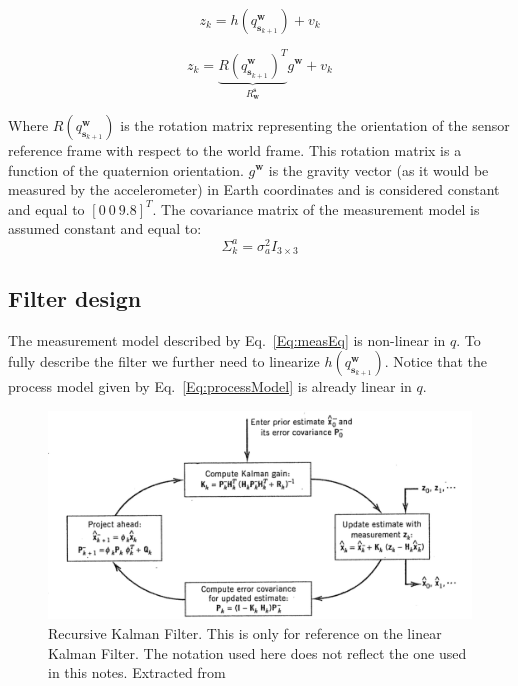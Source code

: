 \documentclass[a4paper,10pt]{article}
\DeclareMathOperator{\sensor}{\mathbf{s}}
\DeclareMathOperator{\world}{\mathbf{w}}
\begin{document}
  \begin{equation}
   z_{k} = h(q^{\world}_{\sensor_{k+1}}) + v_{k}
  \end{equation}
   \begin{tcolorbox}
   \begin{equation}
    z_{k} = \underbrace{R(q^{\world}_{\sensor_{k+1}})^T}_{\text{$R^{\sensor}_{\world}$}} g^\world + v_{k} 
   \end{equation}
   \label{Eq:measEq}
   \end{tcolorbox}
  
  Where $R(q^{\world}_{\sensor_{k+1}})$ is the rotation matrix representing the orientation of the sensor reference frame with respect to the world frame. This rotation matrix is a function of the quaternion orientation. $g^\world$ is the gravity vector (as it would be measured by the accelerometer) in Earth coordinates and is considered constant and equal to $[0~0~9.8]^T$. The covariance matrix of the measurement model is assumed constant and equal to:
  \begin{equation}
   \Sigma^{a}_{k} = \sigma^2_a I_{3\times3}
  \end{equation}
  
  \subsection{Filter design}
  The measurement model described by Eq.~\ref{Eq:measEq} is non-linear in $q$. To fully describe the filter we further need to linearize $h(q^{\world}_{\sensor_{k+1}})$. Notice that the process model given by Eq.~\ref{Eq:processModel} is already linear in $q$.
  
  \begin{figure}[ht!]
 \centering
 \includegraphics[width=\textwidth]{./fig/kalman_loop.png}
 \caption{Recursive Kalman Filter. This is only for reference on the linear Kalman Filter. The notation used here does not reflect the one used in this notes. Extracted from \cite{Grover1996}}
 \label{fig:kalmanLoop}
\end{figure}
\end{document}
